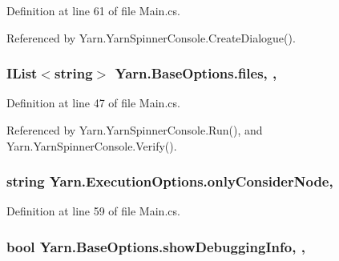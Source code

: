 Definition at line 61 of file Main.\-cs.



Referenced by Yarn.\-Yarn\-Spinner\-Console.\-Create\-Dialogue().

\hypertarget{a00035_aa93cbb1bc1d5328e0a417012621e92d2}{
\subsubsection[{files}]{\setlength{\rightskip}{0pt plus 5cm}I\-List$<$string$>$ Yarn.\-Base\-Options.\-files\hspace{0.3cm}{\ttfamily [get]}, {\ttfamily [set]}, {\ttfamily [inherited]}}}\label{a00035_aa93cbb1bc1d5328e0a417012621e92d2}


Definition at line 47 of file Main.\-cs.



Referenced by Yarn.\-Yarn\-Spinner\-Console.\-Run(), and Yarn.\-Yarn\-Spinner\-Console.\-Verify().

\hypertarget{a00097_af4c0062a1d46281d377f87084fde374e}{
\subsubsection[{only\-Consider\-Node}]{\setlength{\rightskip}{0pt plus 5cm}string Yarn.\-Execution\-Options.\-only\-Consider\-Node\hspace{0.3cm}{\ttfamily [get]}, {\ttfamily [set]}}}\label{a00097_af4c0062a1d46281d377f87084fde374e}


Definition at line 59 of file Main.\-cs.

\hypertarget{a00035_a89964ea17bd19caf00cb5bff563ed01c}{
\subsubsection[{show\-Debugging\-Info}]{\setlength{\rightskip}{0pt plus 5cm}bool Yarn.\-Base\-Options.\-show\-Debugging\-Info\hspace{0.3cm}{\ttfamily [get]}, {\ttfamily [set]}, {\ttfamily [inherited]}}}\label{a00035_a89964ea17bd19caf00cb5bff563ed01c}


